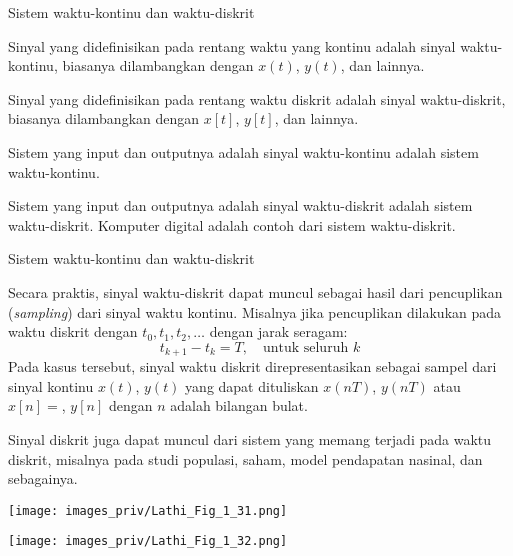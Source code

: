 \begin{frame}{Sistem waktu-kontinu dan waktu-diskrit}

Sinyal yang didefinisikan pada rentang waktu yang kontinu adalah sinyal
waktu-kontinu, biasanya dilambangkan dengan $x(t)$, $y(t)$, dan
lainnya.

Sinyal yang didefinisikan pada rentang waktu diskrit adalah
sinyal waktu-diskrit, biasanya dilambangkan dengan $x[t]$, $y[t]$,
dan lainnya.

Sistem yang input dan outputnya adalah sinyal waktu-kontinu adalah
sistem waktu-kontinu.

Sistem yang input dan outputnya adalah sinyal waktu-diskrit adalah
sistem waktu-diskrit. Komputer digital adalah contoh dari sistem waktu-diskrit.
\end{frame}



\begin{frame}{Sistem waktu-kontinu dan waktu-diskrit}

Secara praktis, sinyal waktu-diskrit dapat muncul sebagai hasil dari
pencuplikan (\textit{sampling}) dari sinyal waktu kontinu. Misalnya jika
pencuplikan dilakukan pada waktu diskrit dengan
$t_0, t_1, t_2, \ldots$ dengan jarak seragam:
$$
t_{k+1} - t_{k} = T, \quad \text{untuk seluruh } k
$$
Pada kasus tersebut, sinyal waktu diskrit direpresentasikan sebagai
sampel dari sinyal kontinu $x(t)$, $y(t)$ yang dapat dituliskan
$x(nT)$, $y(nT)$ atau $x[n] = $, $y[n]$ dengan $n$ adalah bilangan bulat.

Sinyal diskrit juga dapat muncul dari sistem yang memang terjadi
pada waktu diskrit, misalnya pada studi populasi, saham, model pendapatan nasinal,
dan sebagainya.

\end{frame}


\begin{frame}

{\centering
\texttt{[image: images\_priv/Lathi\_Fig\_1\_31.png]}
\par}

\end{frame}


\begin{frame}

{\centering
\texttt{[image: images\_priv/Lathi\_Fig\_1\_32.png]}
\par}
  
\end{frame}